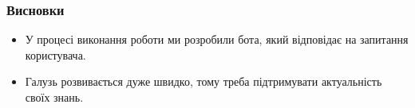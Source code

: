 \documentclass{beamer}
\begin{document}
\begin{frame}
    \frametitle{Висновки}

    \begin{itemize}
        \item У процесі виконання роботи ми розробили бота, який відповідає на запитання користувача.
        \item Галузь розвивається дуже швидко, тому треба підтримувати актуальність своїх знань.
    \end{itemize}
    
\end{frame}
\end{document}
